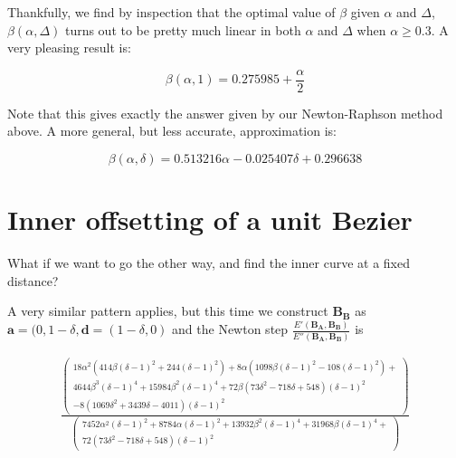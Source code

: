 \documentclass[a4paper]{article}
\newcommand\DrawControl[3]{
  node[#2,circle,fill=#2,inner sep=1pt,label=#3] at #1 {}
}
\begin{document}
Thankfully, we find by inspection that the optimal value of $\beta$ given $\alpha$ and $\Delta$, $\beta(\alpha, \Delta)$ turns out to be pretty much linear in both $\alpha$ and $\Delta$ when $\alpha \ge 0.3$. A very pleasing result is:

\begin{equation}
\beta(\alpha,1) = 0.275985 + \frac{\alpha}{2}
\end{equation}

Note that this gives exactly the answer given by our Newton-Raphson method above. A more general, but less accurate, approximation is:

\begin{equation}\label{approx}
\beta(\alpha, \delta) = 0.513216 \alpha -0.025407 \delta+0.296638
\end{equation}

\section{Inner offsetting of a unit Bezier}

What if we want to go the other way, and find the inner curve at a fixed distance?

\bigskip
{}
\bigskip

A very similar pattern applies, but this time we construct $\mathbf{B_B}$ as
$\mathbf{a} = (0, 1-\delta, \mathbf{d} = (1-\delta, 0)$
and the Newton step $\frac{E'(\mathbf{B_A},\mathbf{B_B})}{E''(\mathbf{B_A},\mathbf{B_B})}$ is

\begin{multline}
\frac{\left(
\begin{matrix}
18 \alpha ^2 \left(414 \beta  (\delta -1)^2+244 (\delta -1)^2\right)+8 \alpha  \left(1098 \beta  (\delta -1)^2-108 (\delta -1)^2\right)+ \\
4644 \beta ^3 (\delta -1)^4+15984 \beta ^2 (\delta -1)^4+72 \beta  \left(73 \delta ^2-718 \delta +548\right) (\delta -1)^2 \\
-8 \left(1069 \delta ^2+3439 \delta -4011\right) (\delta -1)^2
\end{matrix}\right)
}{\left(
  \begin{matrix}7452 \alpha ^2 (\delta -1)^2+8784 \alpha  (\delta -1)^2+13932 \beta ^2 (\delta -1)^4+31968 \beta  (\delta -1)^4+ \\
  72 \left(73 \delta ^2-718 \delta +548\right) (\delta -1)^2
  \end{matrix}\right)
}
\end{multline}
\end{document}
